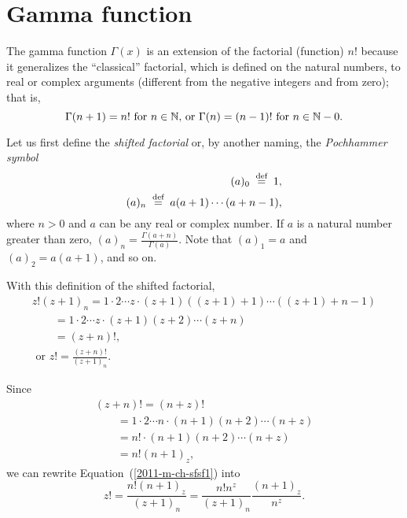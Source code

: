 \section{Gamma function}

The gamma function $\Gamma (x)$ is an extension of the factorial (function)  $n!$ because
it generalizes the ``classical'' factorial, which is defined on the natural numbers,
to real or complex arguments (different from the negative integers and from zero); that is,
\begin{equation}
\Gamma (n+1) = n! \textrm { for } n \in {\Bbb N}
\textrm{, or }
\Gamma (n) = (n-1)! \textrm { for } n \in {\Bbb N}-0
.
\label{2011-m-ch-sfgamman}
\end{equation}

Let us first define the
{\em shifted factorial}
or, by another naming,
the
{\em Pochhammer symbol}
\begin{equation}
\begin{split}
(a)_0\stackrel{{\tiny \textrm{ def }}}{=}1,
\\
(a)_n\stackrel{{\tiny \textrm{ def }}}{=}
a(a+1)\cdots (a+n-1)
,
\end{split}
\label{2011-m-ch-sfsf}
\end{equation}
where $n>0$ and $a$ can be any real or complex number.
If $a$ is a natural number greater than zero, $(a)_n=
\frac{\Gamma (a+n)}{\Gamma(a)}$.
Note that
$(a)_1=a$ and $(a)_2=a(a+1)$,
and so on.


With this definition of the shifted factorial,
\begin{equation}
\begin{split}
 z ! ( z +1)_ n
=1\cdot 2 \cdots  z  \cdot ( z +1)(( z +1)+1)\cdots (( z +1)+ n -1)  \\
\qquad
=1\cdot 2 \cdots  z  \cdot ( z +1)(  z +2)\cdots ( z + n ) \\
\qquad
= ( z + n )! ,
\\
\textrm{ or }
 z !
= \frac{( z + n )!}{  ( z +1)_ n }.
\end{split}
\label{2011-m-ch-sfsf1}
\end{equation}

Since
\begin{equation}
\begin{split}
( z + n )!
=( n + z )!     \\
\qquad
= 1\cdot 2 \cdots  n  \cdot ( n +1)( n +2)\cdots ( n + z )   \\
\qquad
=  n ! \cdot ( n +1)( n +2)\cdots ( n + z )   \\
\qquad
= n !( n +1)_ z  ,
\end{split}
\end{equation}
we can rewrite Equation~(\ref{2011-m-ch-sfsf1}) into
\begin{equation}
 z !
= \frac{ n !( n +1)_ z  }{  ( z +1)_ n }
=   \frac{ n !  n ^ z  }{  ( z +1)_ n }  \frac{( n +1)_ z  }{  n ^ z }
.
\label{2011-m-ch-sfsf2}
\end{equation}

